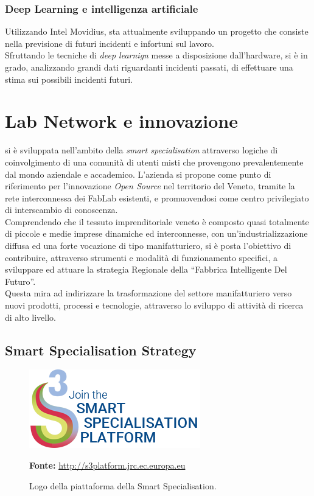 \subsubsection{Deep Learning e intelligenza artificiale}
Utilizzando Intel Movidius, \lab{} sta attualmente sviluppando un progetto che consiste nella previsione di futuri incidenti e infortuni sul lavoro.\\
Sfruttando le tecniche di \textit{deep learnign} messe a disposizione dall'hardware, si è in grado, analizzando grandi dati riguardanti incidenti passati, di effettuare una stima sui possibili incidenti futuri.

\section{Lab Network e innovazione}
\lab{} si è sviluppata nell’ambito della \textit{smart specialisation} attraverso logiche di coinvolgimento di una comunità di utenti misti che provengono prevalentemente dal mondo aziendale e accademico. 
L'azienda si propone come punto di riferimento per l’innovazione \textit{Open Source} nel territorio del Veneto, tramite la rete interconnessa dei \gls{FabLab} esistenti, e promuovendosi come centro privilegiato di interscambio di conoscenza.\\
Comprendendo che il tessuto imprenditoriale veneto è composto quasi totalmente di piccole e medie imprese dinamiche ed interconnesse, con un’industrializzazione diffusa ed una forte vocazione di tipo manifatturiero, \lab{} si è posta l’obiettivo di contribuire, attraverso strumenti e modalità di funzionamento specifici, a sviluppare ed attuare la strategia Regionale della ``Fabbrica Intelligente Del Futuro''.\\
Questa mira ad indirizzare la trasformazione del settore manifatturiero verso nuovi prodotti, processi e tecnologie, attraverso lo sviluppo di attività di ricerca di alto livello.

\subsection{Smart Specialisation Strategy}
\begin{figure}[H]
	\begin{center}
	\includegraphics[scale=0.4]{immagini/join-s3p.png}
	\caption{Logo della piattaforma della Smart Specialisation.}
	\small{\textbf{Fonte:} \url{http://s3platform.jrc.ec.europa.eu}}
	\end{center}
\end{figure}

